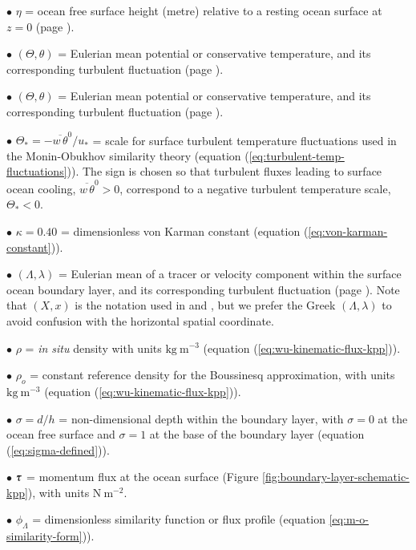 \begin{trivlist}
\item[$\bullet$] $\eta$ = ocean free surface height (metre) relative
  to a resting ocean surface at $z=0$ (page
  \pageref{geopotential_defined}).

\item[$\bullet$] $(\Theta,\theta)$ = Eulerian mean potential or conservative
  temperature, and its corresponding turbulent fluctuation (page
  \pageref{Lambda_defined}).

\item[$\bullet$] $(\Theta,\theta)$ = Eulerian mean potential or conservative
  temperature, and its corresponding turbulent fluctuation (page
  \pageref{Lambda_defined}).

\item[$\bullet$] $\Theta_{*} = -\overline{w \, \theta}^{0} / u_{*}$
  = scale for surface turbulent temperature fluctuations used in the
  Monin-Obukhov similarity theory (equation
  (\ref{eq:turbulent-temp-fluctuations})).  The sign is chosen so that
  turbulent fluxes leading to surface ocean cooling, $\overline{w \,
    \theta}^{0} > 0$, correspond to a negative turbulent
  temperature scale, $\Theta_{*} < 0$.

\item[$\bullet$] $\kappa = 0.40$ = dimensionless von Karman constant
  (equation (\ref{eq:von-karman-constant})).

\item[$\bullet$] $(\Lambda,\lambda)$ = Eulerian mean of a tracer or
  velocity component within the surface ocean boundary layer, and its
  corresponding turbulent fluctuation (page \pageref{lambda_defined}).
  Note that $(X,x)$ is the notation used in \cite{LargeKPP} and
  \cite{LargeKPP_lectures}, but we prefer the Greek
  $(\Lambda,\lambda)$ to avoid confusion with the horizontal spatial
  coordinate.

\item[$\bullet$] $\rho$ = {\it in situ} density with units
  $\mbox{kg}~\mbox{m}^{-3}$ (equation
  (\ref{eq:wu-kinematic-flux-kpp})).

\item[$\bullet$] $\rho_{o}$ = constant reference density for the
  Boussinesq approximation, with units $\mbox{kg}~\mbox{m}^{-3}$
  (equation (\ref{eq:wu-kinematic-flux-kpp})).

\item[$\bullet$] $\sigma = d/h$ = non-dimensional depth within the boundary
  layer, with $\sigma=0$ at the ocean free surface and $\sigma=1$ at
  the base of the boundary layer (equation (\ref{eq:sigma-defined})).

\item[$\bullet$] $\mbox{\boldmath $\tau$}$ = momentum flux at the ocean surface (Figure
  \ref{fig:boundary-layer-schematic-kpp}), with units
  $\mbox{N}~\mbox{m}^{-2}$.

\item[$\bullet$] $\phi_{\Lambda}$ = dimensionless similarity function
  or flux profile (equation \ref{eq:m-o-similarity-form})).

\end{trivlist}  




